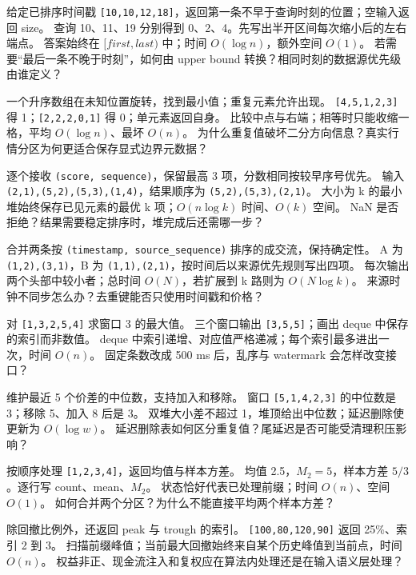 {给定已排序时间戳 \texttt{[10,10,12,18]}，返回第一条不早于查询时刻的位置；空输入返回 size。}
{查询 10、11、19 分别得到 0、2、4。先写出半开区间每次缩小后的左右端点。}
{答案始终在 \([first,last)\) 中；时间 \(O(\log n)\)，额外空间 \(O(1)\)。}
{若需要“最后一条不晚于时刻”，如何由 upper bound 转换？相同时刻的数据源优先级由谁定义？}

{一个升序数组在未知位置旋转，找到最小值；重复元素允许出现。}
{\texttt{[4,5,1,2,3]} 得 1；\texttt{[2,2,2,0,1]} 得 0；单元素返回自身。}
{比较中点与右端；相等时只能收缩一格，平均 \(O(\log n)\)、最坏 \(O(n)\)。}
{为什么重复值破坏二分方向信息？真实行情分区为何更适合保存显式边界元数据？}

{逐个接收 \texttt{(score, sequence)}，保留最高 3 项，分数相同按较早序号优先。}
{输入 \texttt{(2,1),(5,2),(5,3),(1,4)}，结果顺序为 \texttt{(5,2),(5,3),(2,1)}。}
{大小为 k 的最小堆始终保存已见元素的最优 k 项；\(O(n\log k)\) 时间、\(O(k)\) 空间。}
{NaN 是否拒绝？结果需要稳定排序时，堆完成后还需哪一步？}

{合并两条按 \texttt{(timestamp, source\_sequence)} 排序的成交流，保持确定性。}
{A 为 \texttt{(1,2),(3,1)}，B 为 \texttt{(1,1),(2,1)}，按时间后以来源优先规则写出四项。}
{每次输出两个头部中较小者；总时间 \(O(N)\)，若扩展到 k 路则为 \(O(N\log k)\)。}
{来源时钟不同步怎么办？去重键能否只使用时间戳和价格？}

{对 \texttt{[1,3,2,5,4]} 求窗口 3 的最大值。}
{三个窗口输出 \texttt{[3,5,5]}；画出 deque 中保存的索引而非数值。}
{deque 中索引递增、对应值严格递减；每个索引最多进出一次，时间 \(O(n)\)。}
{固定条数改成 500 ms 后，乱序与 watermark 会怎样改变接口？}

{维护最近 5 个价差的中位数，支持加入和移除。}
{窗口 \texttt{[5,1,4,2,3]} 的中位数是 3；移除 5、加入 8 后是 3。}
{双堆大小差不超过 1，堆顶给出中位数；延迟删除使更新为 \(O(\log w)\)。}
{延迟删除表如何区分重复值？尾延迟是否可能受清理积压影响？}

{按顺序处理 \texttt{[1,2,3,4]}，返回均值与样本方差。}
{均值 2.5，\(M_2=5\)，样本方差 \(5/3\)。逐行写 count、mean、\(M_2\)。}
{状态恰好代表已处理前缀；时间 \(O(n)\)、空间 \(O(1)\)。}
{如何合并两个分区？为什么不能直接平均两个样本方差？}

{除回撤比例外，还返回 peak 与 trough 的索引。}
{\texttt{[100,80,120,90]} 返回 25\%、索引 2 到 3。}
{扫描前缀峰值；当前最大回撤始终来自某个历史峰值到当前点，时间 \(O(n)\)。}
{权益非正、现金流注入和复权应在算法内处理还是在输入语义层处理？}


